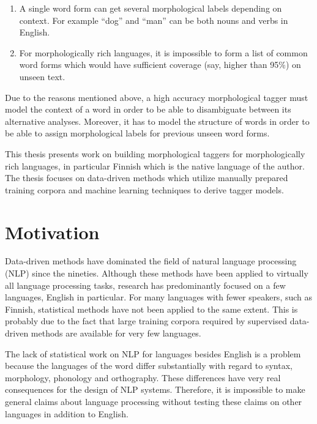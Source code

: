 \begin{enumerate}
\item A single word form can get several morphological labels
  depending on context. For example ``dog'' and ``man'' can be both
  nouns and verbs in English.
\item For morphologically rich languages, it is impossible to form a
  list of common word forms which would have sufficient coverage (say,
  higher than 95\%) on unseen text.
\end{enumerate}

Due to the reasons mentioned above, a high accuracy morphological
tagger must model the context of a word in order to be able to
disambiguate between its alternative analyses. Moreover, it has to
model the structure of words in order to be able to assign
morphological labels for previous unseen word forms.

This thesis presents work on building morphological taggers for
morphologically rich languages, in particular Finnish which is the
native language of the author. The thesis focuses on data-driven
methods which utilize manually prepared training corpora and machine
learning techniques to derive tagger models.

\section{Motivation}
Data-driven methods have dominated the field of natural language
processing (NLP) since the nineties. Although these methods have been
applied to virtually all language processing tasks, research has
predominantly focused on a few languages, English in particular. For
many languages with fewer speakers, such as Finnish, statistical
methods have not been applied to the same extent. This is probably due
to the fact that large training corpora required by supervised
data-driven methods are available for very few languages.

The lack of statistical work on NLP for languages besides English is a
problem because the languages of the word differ substantially with
regard to syntax, morphology, phonology and orthography. These
differences have very real consequences for the design of NLP
systems. Therefore, it is impossible to make general claims about
language processing without testing these claims on other languages
in addition to English.


